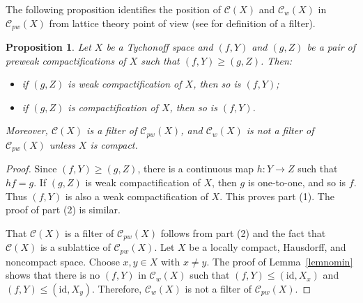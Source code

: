 \documentclass[manuscript]{amsart}
\newtheorem{proposition}[theorem]{Proposition}
\theoremstyle{definition}
\begin{document}
The following proposition identifies the position of $\mathcal{C}(X)$ and
$\mathcal{C}_{w}(X)$ in $\mathcal{C}_{pw}(X)$ from lattice theory point of view (see
\cite{bs81} for definition of a filter).

\begin{proposition}
Let $X$ be a Tychonoff space and
$(f,Y)$ and $(g,Z)$ be a pair of preweak compactifications of
$X$ such that $(f,Y)\geq (g,Z)$. Then:
\begin{itemize}
\item[(1)]
if  $(g,Z)$ is weak compactification of $X$, then so is $(f,Y)$;
\item[(2)]
if  $(g,Z)$ is  compactification of $X$, then so is $(f,Y)$.
\end{itemize}
Moreover, $\mathcal{C}(X)$ is a filter of $\mathcal{C}_{pw}(X)$, and
$\mathcal{C}_{w}(X)$ is not a filter of $\mathcal{C}_{pw}(X)$ unless
$X$ is  compact.
\end{proposition}
\begin{proof}
Since $(f,Y)\geq (g,Z)$, there is a continuous map
$h:Y\to Z$ such that $hf=g$. If
 $(g,Z)$ is weak compactification of $X$, then $g$ is one-to-one, and
 so is $f$. Thus $(f,Y)$ is also a weak compactification of $X$. This proves part (1).
 The proof of part (2) is similar.

 That $\mathcal{C}(X)$ is a filter of $\mathcal{C}_{pw}(X)$
 follows from  part (2) and the fact that $\mathcal{C}(X)$ is a sublattice of $\mathcal{C}_{pw}(X)$.
Let $X$ be a locally compact, Hausdorff, and noncompact space. Choose $x,y\in X$
 with $x\neq y$. The proof of Lemma~\ref{lemnomin} shows that
 there is no $(f,Y)$ in $\mathcal{C}_{w}(X)$ such that
 $(f,Y)\leq (\mathrm{id}, X_{x})$ and $(f,Y)\leq (\mathrm{id}, X_{y})$.
 Therefore, $\mathcal{C}_{w}(X)$ is not a filter of $\mathcal{C}_{pw}(X)$.
\end{proof}
\end{document}
